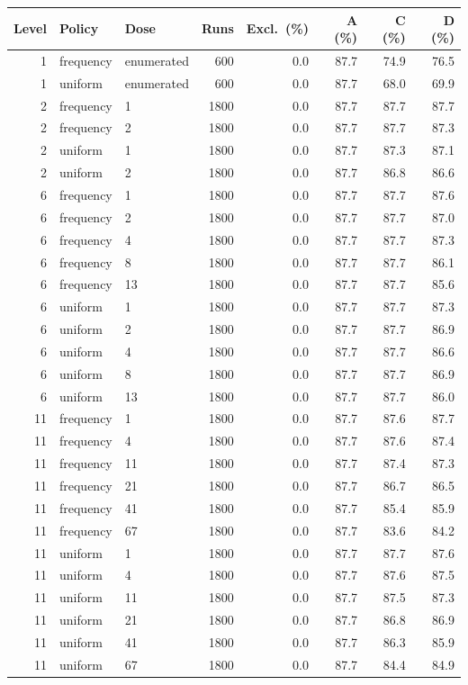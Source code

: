\begin{tabular}{rllrrrrr}
\toprule
Level & Policy & Dose & Runs & Excl.\ (\%) & A (\%) & C (\%) & D (\%) \\
\midrule
1 & frequency & enumerated & 600 & 0.0 & 87.7 & 74.9 & 76.5 \\
1 & uniform & enumerated & 600 & 0.0 & 87.7 & 68.0 & 69.9 \\
2 & frequency & 1 & 1800 & 0.0 & 87.7 & 87.7 & 87.7 \\
2 & frequency & 2 & 1800 & 0.0 & 87.7 & 87.7 & 87.3 \\
2 & uniform & 1 & 1800 & 0.0 & 87.7 & 87.3 & 87.1 \\
2 & uniform & 2 & 1800 & 0.0 & 87.7 & 86.8 & 86.6 \\
6 & frequency & 1 & 1800 & 0.0 & 87.7 & 87.7 & 87.6 \\
6 & frequency & 2 & 1800 & 0.0 & 87.7 & 87.7 & 87.0 \\
6 & frequency & 4 & 1800 & 0.0 & 87.7 & 87.7 & 87.3 \\
6 & frequency & 8 & 1800 & 0.0 & 87.7 & 87.7 & 86.1 \\
6 & frequency & 13 & 1800 & 0.0 & 87.7 & 87.7 & 85.6 \\
6 & uniform & 1 & 1800 & 0.0 & 87.7 & 87.7 & 87.3 \\
6 & uniform & 2 & 1800 & 0.0 & 87.7 & 87.7 & 86.9 \\
6 & uniform & 4 & 1800 & 0.0 & 87.7 & 87.7 & 86.6 \\
6 & uniform & 8 & 1800 & 0.0 & 87.7 & 87.7 & 86.9 \\
6 & uniform & 13 & 1800 & 0.0 & 87.7 & 87.7 & 86.0 \\
11 & frequency & 1 & 1800 & 0.0 & 87.7 & 87.6 & 87.7 \\
11 & frequency & 4 & 1800 & 0.0 & 87.7 & 87.6 & 87.4 \\
11 & frequency & 11 & 1800 & 0.0 & 87.7 & 87.4 & 87.3 \\
11 & frequency & 21 & 1800 & 0.0 & 87.7 & 86.7 & 86.5 \\
11 & frequency & 41 & 1800 & 0.0 & 87.7 & 85.4 & 85.9 \\
11 & frequency & 67 & 1800 & 0.0 & 87.7 & 83.6 & 84.2 \\
11 & uniform & 1 & 1800 & 0.0 & 87.7 & 87.7 & 87.6 \\
11 & uniform & 4 & 1800 & 0.0 & 87.7 & 87.6 & 87.5 \\
11 & uniform & 11 & 1800 & 0.0 & 87.7 & 87.5 & 87.3 \\
11 & uniform & 21 & 1800 & 0.0 & 87.7 & 86.8 & 86.9 \\
11 & uniform & 41 & 1800 & 0.0 & 87.7 & 86.3 & 85.9 \\
11 & uniform & 67 & 1800 & 0.0 & 87.7 & 84.4 & 84.9 \\
\bottomrule
\end{tabular}
